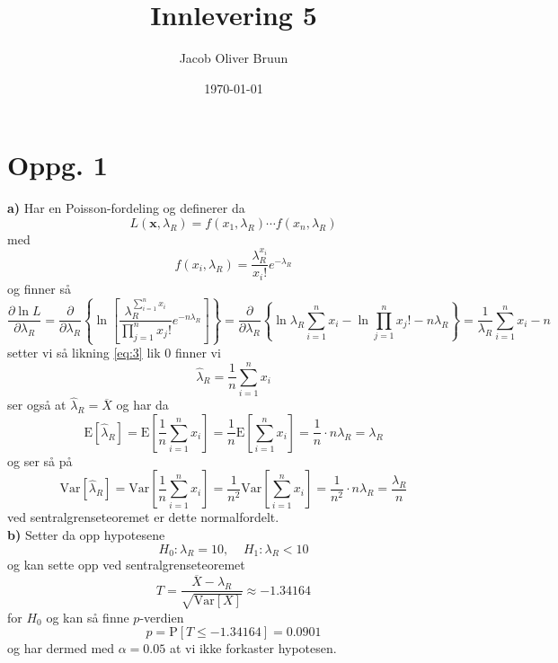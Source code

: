 \documentclass{report}
\title{Innlevering 5}
\author{Jacob Oliver Bruun}
\date{\today}
\newcommand{\bbrack}[1]{\left[ #1 \right]}
\newcommand{\cbrack}[1]{\left\lbrace #1 \right\rbrace}
\newcommand{\Var}[1]{\text{Var} \bbrack{ #1 }}
\newcommand{\fvv}[1]{\text{E} \bbrack{ #1 }}
\newcommand{\Prob}[1]{\text{P} \bbrack{ #1 }}
\begin{document}
\section*{Oppg. 1}
\textbf{a)}
Har en Poisson-fordeling og definerer da
\begin{equation}
  \label{eq:1}
  L(\mathbf{x}, \lambda_{R}) = f(x_{1}, \lambda_{R}) \cdots f(x_{n}, \lambda_{R})
\end{equation}
med
\begin{equation}
  \label{eq:2}
  f(x_{i}, \lambda_{R}) = \frac{\lambda_{R}^{x_{i}}}{x_{i}!} e^{-\lambda_{R}}
\end{equation}
og finner så
\begin{equation}
  \label{eq:3}
  \frac{\partial \ln L}{\partial \lambda_{R}} = \frac{\partial}{\partial \lambda_{R}} \cbrack{ \ln \bbrack{ \frac{\lambda_{R}^{\sum_{i=1}^{n} x_{i}}}{\prod_{j=1}^{n}x_{j}!} e^{-n\lambda_{R}} } } = \frac{\partial}{\partial \lambda_{R}} \cbrack{ \ln \lambda_{R} \sum_{i=1}^{n}x_{i} - \ln \prod_{j=1}^{n}x_{j}! - n\lambda_{R}} = \frac{1}{\lambda_{R}} \sum_{i=1}^{n}x_{i} - n
\end{equation}
setter vi så likning \eqref{eq:3} lik 0 finner vi
\begin{equation}
  \label{eq:4}
  \hat{\lambda}_{R} = \frac{1}{n} \sum_{i=1}^{n} x_{i}
\end{equation}
ser også at $\hat{\lambda}_{R} = \overline{X}$ og har da
\begin{equation}
  \label{eq:5}
  \fvv{\hat{\lambda}_{R}} = \fvv{ \frac{1}{n} \sum_{i=1}^{n} x_{i} } = \frac{1}{n} \fvv{ \sum_{i=1}^{n} x_{i}} = \frac{1}{n} \cdot n\lambda_{R} = \lambda_{R}
\end{equation}
og ser så på
\begin{equation}
  \label{eq:6}
  \Var{\hat{\lambda}_{R}} = \Var{\frac{1}{n} \sum_{i=1}^{n} x_{i}} = \frac{1}{n^{2}} \Var{\sum_{i=1}^{n} x_{i}} = \frac{1}{n^{2}} \cdot n\lambda_{R} = \frac{\lambda_{R}}{n}
\end{equation}
ved sentralgrenseteoremet er dette normalfordelt. \\

\textbf{b)}
Setter da opp hypotesene
\begin{equation}
  \label{eq:7}
  H_{0} : \lambda_{R} = 10, \;\;\;\; H_{1} : \lambda_{R} < 10
\end{equation}
og kan sette opp ved sentralgrenseteoremet
\begin{equation}
  \label{eq:8}
  T = \frac{\overline{X} - \lambda_{R}}{\sqrt{\Var{X}}} \approx -1.34164
\end{equation}
for $H_{0}$ og kan så finne $p$-verdien
\begin{equation}
  \label{eq:9}
  p = \Prob{ T \leq -1.34164 } = 0.0901
\end{equation}
og har dermed med $\alpha = 0.05$ at vi ikke forkaster hypotesen. \\
\end{document}
